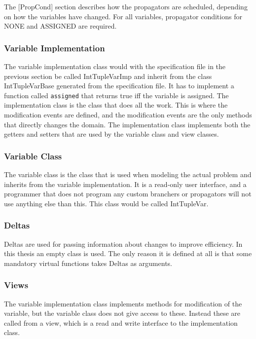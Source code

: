 \documentclass[a4paper,11pt]{article}
\begin{document}
The [PropCond] section describes how the propagators are scheduled, depending on how the variables have changed. For all variables, propagator conditions for NONE and ASSIGNED are required.

\subsubsection{Variable Implementation}
The variable implementation class would with the specification file in the previous section be called IntTupleVarImp and inherit from the class IntTupleVarBase generated from the specification file. It has to implement a function called \texttt{assigned} that returns true iff the variable is assigned. The implementation class is the class that does all the work. This is where the modification events are defined, and the modification events are the only methods that directly changes the domain. The implementation class implements both the getters and setters that are used by the variable class and view classes.

\subsubsection{Variable Class}
The variable class is the class that is used when modeling the actual problem and inherits from the variable implementation. It is a read-only user interface, and a programmer that does not program any custom branchers or propagators will not use anything else than this. This class would be called IntTupleVar.
\subsubsection{Deltas}
Deltas are used for passing information about changes to improve efficiency. In this thesis an empty class is used. The only reason it is defined at all is that some mandatory virtual functions takes Deltas as arguments.

\subsubsection{Views}
The variable implementation class implements methods for modification of the variable, but the variable class does not give access to these. Instead these are called from a view, which is a read and write interface to the implementation class.
\end{document}
